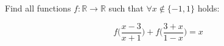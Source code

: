 Find all functions $f:\mathbb{R}\rightarrow \mathbb{R}$ such that $ \forall x\notin\{-1,1\}$ holds:

\[\displaystyle{f\Big(\frac{x-3}{x+1}\Big)+f\Big(\frac{3+x}{1-x}\Big)=x}\]
